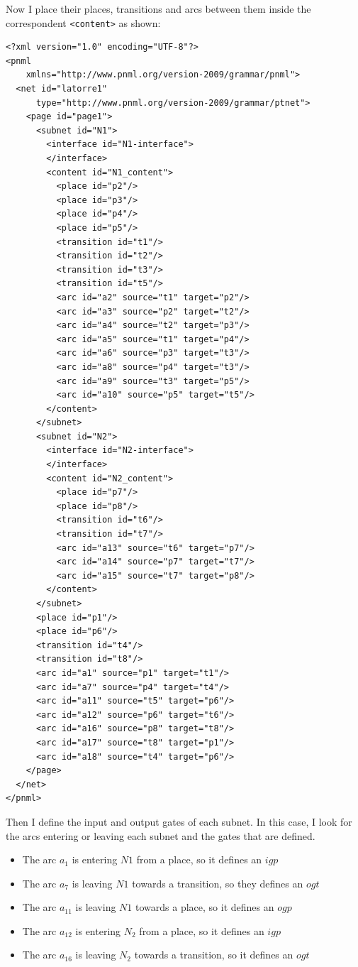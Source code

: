 Now I place their places, transitions and arcs between them inside the correspondent
\texttt{<content>} as shown: 

\begin{lstlisting}
<?xml version="1.0" encoding="UTF-8"?>
<pnml
    xmlns="http://www.pnml.org/version-2009/grammar/pnml">
  <net id="latorre1"
      type="http://www.pnml.org/version-2009/grammar/ptnet">
    <page id="page1">
      <subnet id="N1">
        <interface id="N1-interface">
        </interface>
        <content id="N1_content">
          <place id="p2"/>
          <place id="p3"/>
          <place id="p4"/>
          <place id="p5"/>
          <transition id="t1"/>
          <transition id="t2"/>
          <transition id="t3"/>
          <transition id="t5"/>
          <arc id="a2" source="t1" target="p2"/>
          <arc id="a3" source="p2" target="t2"/>
          <arc id="a4" source="t2" target="p3"/>
          <arc id="a5" source="t1" target="p4"/>
          <arc id="a6" source="p3" target="t3"/>
          <arc id="a8" source="p4" target="t3"/>
          <arc id="a9" source="t3" target="p5"/>
          <arc id="a10" source="p5" target="t5"/>
        </content>
      </subnet>
      <subnet id="N2">
        <interface id="N2-interface">
        </interface>
        <content id="N2_content">
          <place id="p7"/>
          <place id="p8"/>
          <transition id="t6"/>
          <transition id="t7"/>
          <arc id="a13" source="t6" target="p7"/>
          <arc id="a14" source="p7" target="t7"/>
          <arc id="a15" source="t7" target="p8"/>
        </content>
      </subnet>
      <place id="p1"/>
      <place id="p6"/>
      <transition id="t4"/>
      <transition id="t8"/>
      <arc id="a1" source="p1" target="t1"/>
      <arc id="a7" source="p4" target="t4"/>
      <arc id="a11" source="t5" target="p6"/>
      <arc id="a12" source="p6" target="t6"/>
      <arc id="a16" source="p8" target="t8"/>
      <arc id="a17" source="t8" target="p1"/>
      <arc id="a18" source="t4" target="p6"/>
    </page>
  </net>
</pnml>
\end{lstlisting}

Then I define the input and output gates of each subnet. In this case,
I look for the arcs entering or leaving each subnet and the gates that are
defined.

\begin{itemize}
\item The arc $a_1$ is entering $N1$ from a place, so it defines
an $igp$
\item The arc $a_7$ is leaving $N1$ towards a transition, so they defines
an $ogt$
\item The arc $a_{11}$ is leaving $N1$ towards a place, so it defines an
$ogp$
\item The arc $a_{12}$ is entering $N_2$ from a place, so it defines an $igp$
\item The arc $a_{16}$ is leaving $N_2$ towards a transition, so it defines
an $ogt$
\end{itemize}

